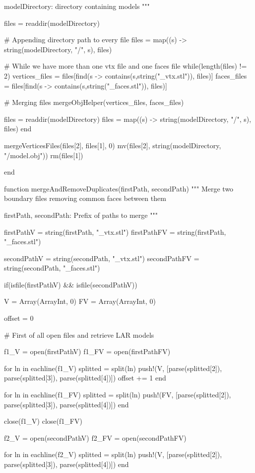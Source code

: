 \documentclass[11pt,oneside]{article}	%
\begin{document}
{  modelDirectory: directory containing models
  """

  files = readdir(modelDirectory)

  # Appending directory path to every file
  files = map((s) -> string(modelDirectory, "/", s), files)

  # While we have more than one vtx file and one faces file
  while(length(files) != 2)
    vertices_files = files[find(s -> contains(s,string("_vtx.stl")), files)]
    faces_files = files[find(s -> contains(s,string("_faces.stl")), files)]

    # Merging files
    mergeObjHelper(vertices_files, faces_files)

    files = readdir(modelDirectory)
    files = map((s) -> string(modelDirectory, "/", s), files)
  end

  mergeVerticesFiles(files[2], files[1], 0)
  mv(files[2], string(modelDirectory, "/model.obj"))
  rm(files[1])

end

function mergeAndRemoveDuplicates(firstPath, secondPath)
  """
  Merge two boundary files removing common faces between
  them

  firstPath, secondPath: Prefix of paths to merge
  """

  firstPathV = string(firstPath, "_vtx.stl")
  firstPathFV = string(firstPath, "_faces.stl")

  secondPathV = string(secondPath, "_vtx.stl")
  secondPathFV = string(secondPath, "_faces.stl")

  if(isfile(firstPathV) && isfile(secondPathV))

    V = Array(Array{Int}, 0)
    FV = Array(Array{Int}, 0)

    offset = 0

    # First of all open files and retrieve LAR models

    f1_V = open(firstPathV)
    f1_FV = open(firstPathFV)

    for ln in eachline(f1_V)
      splitted = split(ln)
      push!(V, [parse(splitted[2]), parse(splitted[3]), parse(splitted[4])])
      offset += 1
    end

    for ln in eachline(f1_FV)
      splitted = split(ln)
      push!(FV, [parse(splitted[2]), parse(splitted[3]), parse(splitted[4])])
    end

    close(f1_V)
    close(f1_FV)

    f2_V = open(secondPathV)
    f2_FV = open(secondPathFV)

    for ln in eachline(f2_V)
      splitted = split(ln)
      push!(V, [parse(splitted[2]), parse(splitted[3]), parse(splitted[4])])
    end

}
\end{document}
